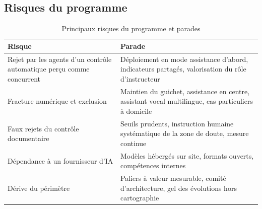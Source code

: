 \subsection{Risques du programme}
\begin{table}[h]
\caption{Principaux risques du programme et parades}
\label{tab:risques}
\centering
\small
\begin{tabularx}{\columnwidth}{XX}
\toprule
\textbf{Risque} & \textbf{Parade} \\
\midrule
Rejet par les agents d'un contrôle automatique perçu comme concurrent & Déploiement en mode assistance d'abord, indicateurs partagés, valorisation du rôle d'instructeur \\
Fracture numérique et exclusion & Maintien du guichet, assistance en centre, assistant vocal multilingue, cas particuliers à domicile \\
Faux rejets du contrôle documentaire & Seuils prudents, instruction humaine systématique de la zone de doute, mesure continue \\
Dépendance à un fournisseur d'IA & Modèles hébergés sur site, formats ouverts, compétences internes \\
Dérive du périmètre & Paliers à valeur mesurable, comité d'architecture, gel des évolutions hors cartographie \\
\bottomrule
\end{tabularx}
\end{table}
